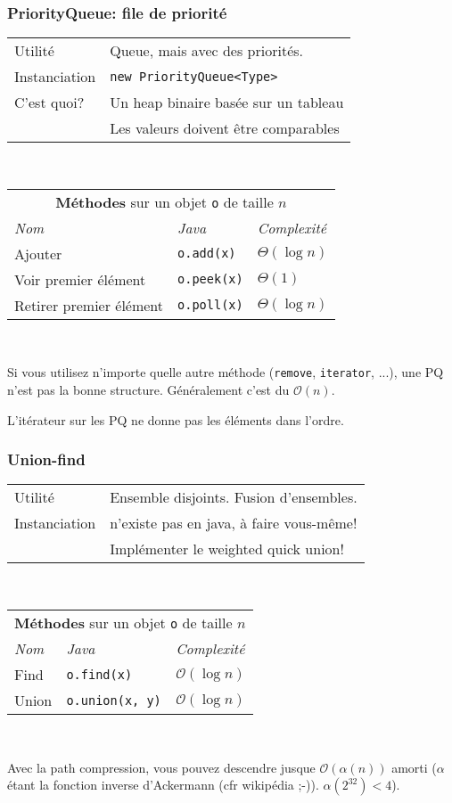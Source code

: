 \documentclass[8pt,aspectratio=169]{beamer}
\begin{document}
\begin{frame}
\frametitle{PriorityQueue: file de priorité}
\centering
\begin{tabular}{ll}
	Utilité & Queue, mais avec des priorités.\\
	Instanciation & \texttt{new PriorityQueue<Type>}\\
	C'est quoi? & Un heap binaire basée sur un tableau\\
	& \color{red} Les valeurs doivent être comparables
	
\end{tabular}\\
\vspace{0.5cm}
\centering
\begin{tabular}{lll}
	\multicolumn{3}{c}{\textbf{Méthodes} sur un objet \texttt{o} de taille $n$} \\
	\textit{Nom} & \textit{Java} & \textit{Complexité} \\
	Ajouter & \texttt{o.add(x)} & $\Theta(\log n)$\\
	Voir premier élément & \texttt{o.peek(x)} & $\Theta(1)$\\
	Retirer premier élément & \texttt{o.poll(x)} & $\Theta(\log n)$
\end{tabular}\\
\vspace{0.5cm}

\color{red} Si vous utilisez n'importe quelle autre méthode (\texttt{remove}, \texttt{iterator}, ...), une PQ n'est pas la bonne structure. Généralement c'est du $\mathcal{O}(n)$.

\color{red} L'itérateur sur les PQ ne donne pas les éléments dans l'ordre.
\end{frame}

\begin{frame}
\frametitle{Union-find}
\centering
\begin{tabular}{ll}
	Utilité & Ensemble disjoints. Fusion d'ensembles.\\
	Instanciation & n'existe pas en java, à faire vous-même!\\
	& \color{red} Implémenter le weighted quick union!
	
\end{tabular}\\
\vspace{0.5cm}
\centering
\begin{tabular}{lll}
	\multicolumn{3}{c}{\textbf{Méthodes} sur un objet \texttt{o} de taille $n$} \\
	\textit{Nom} & \textit{Java} & \textit{Complexité} \\
	Find & \texttt{o.find(x)} & $\mathcal{O}(\log n)$\\
	Union & \texttt{o.union(x, y)} & $\mathcal{O}(\log n)$
\end{tabular}\\
\vspace{0.5cm}

\color{blue} Avec la path compression, vous pouvez descendre jusque $\mathcal{O}(\alpha(n))$ amorti ($\alpha$ étant la fonction inverse d'Ackermann (cfr wikipédia ;-)). $\alpha(2^{32}) < 4$).
\end{frame}
\end{document}
